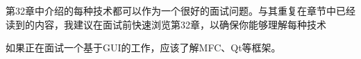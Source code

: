 第32章中介绍的每种技术都可以作为一个很好的面试问题。与其重复在章节中已经读到的内容，我建议在面试前快速浏览第32章，以确保你能够理解每种技术

如果正在面试一个基于GUI的工作，应该了解MFC、Qt等框架。